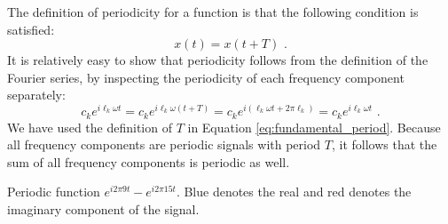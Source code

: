 The definition of periodicity for a function is that the following condition is satisfied:
\begin{equation}
  \boxed{
    x(t) = x(t+T)
  } \,\,.
\end{equation}
It is relatively easy to show that periodicity follows from the definition of the Fourier series,
by inspecting the periodicity of each frequency component separately:
\begin{equation}
  c_k e^{i \ell_k \omega t} = c_k e^{i \ell_k \omega (t+T)} = c_k e^{i (\ell_k \omega t+ 2\pi \ell_k )} = c_k e^{i \ell_k \omega t} \,\,.
\end{equation}
We have used the definition of $T$ in Equation \ref{eq:fundamental_period}. Because all frequency
components are periodic signals with period $T$, it follows that the sum of all frequency components is periodic as well.

\begin{marginfigure}[0cm]
  \begin{center}
  \end{center}
  \caption{Periodic function $e^{i 2\pi 9t} - e^{i 2\pi 15t}$. 
  Blue denotes the real and red denotes the imaginary component of the signal.}
  \label{fig:ex_periodic}
\end{marginfigure}

